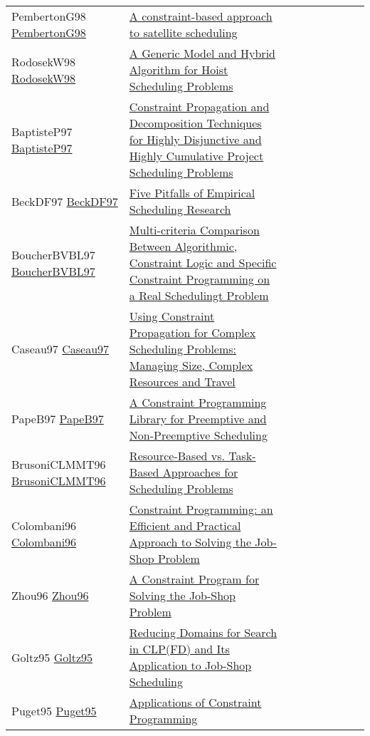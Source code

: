 {\begin{longtable}{p{3cm}p{7cm}lllllll}
PembertonG98 \href{https://doi.org/10.1090/dimacs/057/06}{PembertonG98} &  \href{papers/PembertonG98.pdf}{A constraint-based approach to satellite scheduling} &  &  &  &  &  &  & \\
RodosekW98 \href{https://doi.org/10.1007/3-540-49481-2\_28}{RodosekW98} &  \href{papers/RodosekW98.pdf}{A Generic Model and Hybrid Algorithm for Hoist Scheduling Problems} &  &  &  &  &  &  & \\
BaptisteP97 \href{https://doi.org/10.1007/BFb0017454}{BaptisteP97} &  \href{papers/BaptisteP97.pdf}{Constraint Propagation and Decomposition Techniques for Highly Disjunctive and Highly Cumulative Project Scheduling Problems} &  &  &  &  &  &  & \\
BeckDF97 \href{https://doi.org/10.1007/BFb0017455}{BeckDF97} &  \href{papers/BeckDF97.pdf}{Five Pitfalls of Empirical Scheduling Research} &  &  &  &  &  &  & \\
BoucherBVBL97 \href{}{BoucherBVBL97} &  \href{}{Multi-criteria Comparison Between Algorithmic, Constraint Logic and Specific Constraint Programming on a Real Schedulingt Problem} &  &  &  &  &  &  & \\
Caseau97 \href{https://doi.org/10.1007/BFb0017437}{Caseau97} &  \href{papers/Caseau97.pdf}{Using Constraint Propagation for Complex Scheduling Problems: Managing Size, Complex Resources and Travel} &  &  &  &  &  &  & \\
PapeB97 \href{}{PapeB97} &  \href{}{A Constraint Programming Library for Preemptive and Non-Preemptive Scheduling} &  &  &  &  &  &  & \\
BrusoniCLMMT96 \href{https://doi.org/10.1007/3-540-61286-6\_157}{BrusoniCLMMT96} &  \href{papers/BrusoniCLMMT96.pdf}{Resource-Based vs. Task-Based Approaches for Scheduling Problems} &  &  &  &  &  &  & \\
Colombani96 \href{https://doi.org/10.1007/3-540-61551-2\_72}{Colombani96} &  \href{papers/Colombani96.pdf}{Constraint Programming: an Efficient and Practical Approach to Solving the Job-Shop Problem} &  &  &  &  &  &  & \\
Zhou96 \href{https://doi.org/10.1007/3-540-61551-2\_97}{Zhou96} &  \href{papers/Zhou96.pdf}{A Constraint Program for Solving the Job-Shop Problem} &  &  &  &  &  &  & \\
Goltz95 \href{https://doi.org/10.1007/3-540-60299-2\_33}{Goltz95} &  \href{papers/Goltz95.pdf}{Reducing Domains for Search in {CLP(FD)} and Its Application to Job-Shop Scheduling} &  &  &  &  &  &  & \\
Puget95 \href{https://doi.org/10.1007/3-540-60299-2\_43}{Puget95} &  \href{papers/Puget95.pdf}{Applications of Constraint Programming} &  &  &  &  &  &  & \\

\end{longtable}}

